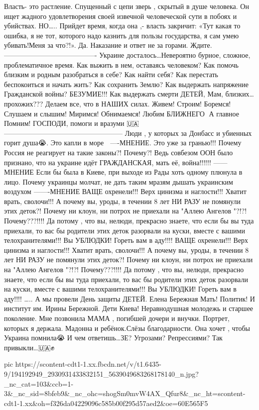 Власть- это растление. 
Спущенный с цепи зверь , скрытый в душе человека.
Он ищет 
жадного удовлетворения  своей извечной человеческой сути в побоях  и убийствах.
   НО…..
Прийдет время, когда  она ,- власть закричит:
«Тут какая то ошибка, я не тот, которого надо казнить для пользы государства, я сам умею убивать!Меня за что?!». 
  Да. Наказание и ответ не за горами.  Ждите.
—————————————-
Украине досталось…Невероятно бурное, сложное, проблематичное время. 
Как выжить в нем, 
оставаясь человеком? 
Как помочь близким и родным разобраться в себе? 
Как найти  себя? 
Как перестать беспокоиться и начать жить? 
Как сохранить Землю?
Как выдержать напряжение Гражданской войны? БЕЗУМИЕ!!! 
Как выдержать  смерти ДЕТЕЙ, Мам, близких… прохожих???
Делаем все, что в НАШИХ силах.  Живем! Строим! Боремся!  Слушаем и слышим! Миримся! Обнимаемся! Любим БЛИЖНЕГО🙏
А главное Помним! 
ГОСПОДИ, 
помоги и вразуми 🇺🇦
—————————————————
Люди , у которых  за Донбасс и убиенных горит душа😭. 
Это капли в море 🌊 
—-МНЕНИЕ.
Это  уже за гранью!!! Почему Россия не реагирует на такие законы?! Почему?! Ведь совбезом ООН было признано, что на украине идёт ГРАЖДАНСКАЯ, мать её, война!!!!!!
——МНЕНИЕ
Если бы была в Киеве, при выходе из Рады хоть одному плюнула в лицо. Почему украинцы молчат, не дать таким мразям дышать украинским воздухом
 ——-МНЕНИЕ
ВАЩЕ охренели!!! Верх цинизма и наглости!!! Хватит врать, сволочи!!!
А почему вы, уроды, в течении 8 лет НИ РАЗУ не помянули этих деток?! Почему ни клоун, ни потрох не приехали на "Аллею Ангелов "?!?! Почему???!!!! Да потому , что вы, нелюди, прекрасно знаете, что если бы вы туда приехали, то вас бы родители этих деток разорвали на куски, вместе с вашими телохранителями!!! Вы УБЛЮДКИ! Гореть вам в аду!!!! ВАЩЕ охренели!!! Верх цинизма и наглости!!! Хватит врать, сволочи!!!
А почему вы, уроды, в течении 8 лет НИ РАЗУ не помянули этих деток?! Почему ни клоун, ни потрох не приехали на "Аллею Ангелов "?!?! Почему???!!!! Да потому , что вы, нелюди, прекрасно знаете, что если бы вы туда приехали, то вас бы родители этих деток разорвали на куски, вместе с вашими телохранителями!!! Вы УБЛЮДКИ! Гореть вам в аду!!!!
…..
 А мы провели День защиты ДЕТЕЙ.  
Елена Бережная Мать! Политик! 
И институт им. Ирины Бережной. Дети Киева! Неравнодушная молодежь и старшее поколение. 
Мне позвонила МАМА  , погибшей дочери и внучки. Портрет, которых я держала.  Мадонна и ребёнок.Слёзы благодарности. 
Она хочет , чтобы Украина помнила😭
И чем ответишь…ЗЕ?
Угрозами? 
Репрессиями? 
Так привыкли…🇺🇦✊

\ifcmt
  pic https://scontent-cdt1-1.xx.fbcdn.net/v/t1.6435-9/194192949_2930931433832151_5639049683268178140_n.jpg?_nc_cat=103&ccb=1-3&_nc_sid=8bfeb9&_nc_ohc=shogSm0mvW4AX_Qfur8&_nc_ht=scontent-cdt1-1.xx&oh=f326da04229096c585b00f295d57aed2&oe=60E565F5
\fi

